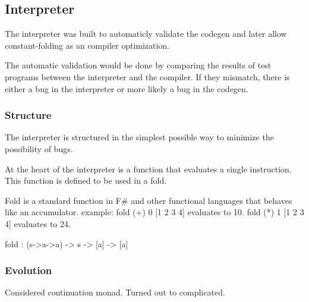 \subsection{Interpreter}
The interpreter was built to automaticly validate the codegen and later allow constant-folding as an compiler optimization.

The automatic validation would be done by comparing the results of test programs between the interpreter and the compiler.
If they mismatch, there is either a bug in the interpreter or more likely a bug in the codegen.

\subsubsection{Structure}
The interpreter is structured in the simplest possible way to minimize the possibility of bugs.

At the heart of the interpreter is a function that evaluates a single instruction.
This function is defined to be used in a fold.

Fold is a standard function in F\# and other functional languages that behaves like an accumulator.
example: fold (+) 0 [1 2 3 4] evaluates to 10.
fold (*) 1 [1 2 3 4] evaluates to 24.

\begin{code}
    fold : (s->a->a) -> s -> [a] -> [a]
\end{code}

\subsubsection{Evolution}
Considered continuation monad.
Turned out to complicated.
